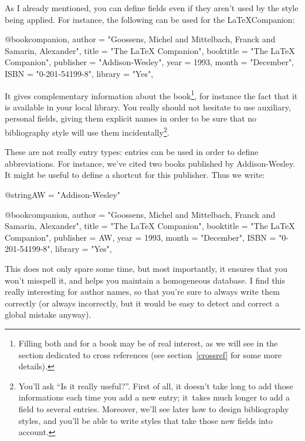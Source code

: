 As I already mentioned, you can define fields even if they aren't
used by the style being applied. For instance, the following can be
used for the \LaTeX Companion:
\begin{verbatimtab}
@book{companion,
  author 	= "Goossens, Michel and Mittelbach, Franck and Samarin, Alexander",
  title 	= "The {{\LaTeX}} {C}ompanion",
  booktitle 	= "The {{\LaTeX}} {C}ompanion",
  publisher 	= "Addison-Wesley",
  year 		= 1993,
  month		= "December",
  ISBN 		= "0-201-54199-8",
  library 	= "Yes",
}
\end{verbatimtab}
It gives complementary information about the book\footnote{Filling
both  and  for a book may be of real
interest, as we will see in the section dedicated to cross references
(see section~\ref{crossref} for some more details).}, for instance the
fact that it is available in your local library.  You really should
not hesitate to use auxiliary, personal fields, giving them explicit
names in order to be sure that no bibliography style will use them
incidentally\footnote{You'll ask ``Is it really useful?''. First of
all, it doesn't take long to add those informations each time you add a
new entry; it~takes much longer to add a field to several
entries. Moreover, we'll see later how to design bibliography styles,
and you'll be able to write styles that take those new fields into
account.}.


\label{strpre}

These are not really entry types: 
entries can be used in order to define abbreviations. For instance,
we've cited two books published by Addison-Wesley. It might be useful
to define a shortcut for this publisher. Thus we write:
\begin{verbatimtab}
@string{AW	= "Addison-Wesley"}

@book{companion,
  author 	= "Goossens, Michel and Mittelbach, Franck and Samarin, Alexander",
  title 	= "The {{\LaTeX}} {C}ompanion",
  booktitle 	= "The {{\LaTeX}} {C}ompanion",
  publisher 	= AW,
  year 		= 1993,
  month		= "December",
  ISBN 		= "0-201-54199-8",
  library 	= "Yes",
}
\end{verbatimtab}

This does not only spare some time, but most importantly, it ensures that
you won't misspell it, and helps you maintain a homogeneous database.
I find this really interesting for author names, so that you're sure
to always write them correctly (or always incorrectly, but it would 
be easy to detect and correct a global mistake anyway).


